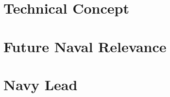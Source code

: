 \documentclass[12pt]{article}
\begin{document}
\section{Technical Concept}









\section{Future Naval Relevance}



\section{Navy Lead}
\end{document}
